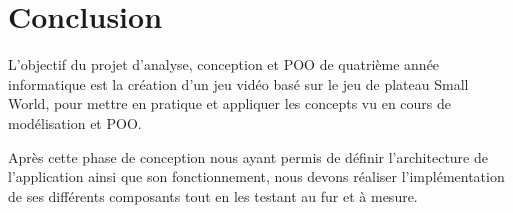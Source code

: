 \documentclass[a4paper]{article}%
\begin{document}
\newpage

\section*{Conclusion}

L'objectif du projet d'analyse, conception et POO de quatrième année informatique est la création d'un jeu vidéo basé sur le jeu de plateau Small World, pour mettre en pratique et appliquer les concepts vu en cours de modélisation et POO.

\medskip

Après cette phase de conception nous ayant permis de définir l'architecture de l'application ainsi que son fonctionnement, nous devons réaliser l'implémentation de ses différents composants tout en les testant au fur et à mesure.

\newpage
\listoffigures
\end{document}

